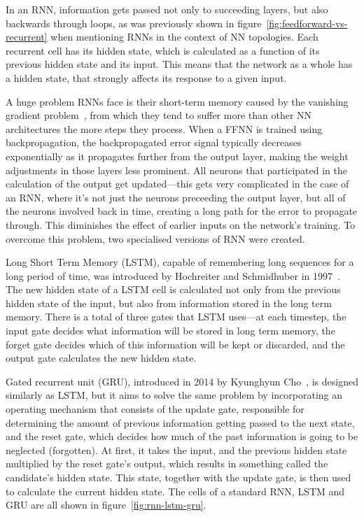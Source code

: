 In an RNN, information gets passed not only to succeeding layers, but also backwards through
loops, as was previously shown in figure~\ref{fig:feedforward-vs-recurrent} when mentioning RNNs
in the context of NN topologies. Each recurrent cell has its
 hidden state, which is calculated as a function of
its previous hidden state and its input. This means that the network as a whole
has a hidden state, that strongly affects its response to a given input.

A huge problem RNNs face is their short-term memory caused by the vanishing gradient
problem~\cite{hochreiter1991untersuchungen},
from which they tend to suffer more than other NN architectures the more steps they process.
When a FFNN is trained using backpropagation, the backpropagated error signal typically decreases
exponentially as it propagates further from the output layer, making the weight adjustments
in those layers less prominent. All neurons that participated in the calculation
of the output get updated---this gets very complicated in the case of an RNN,
where it's not just the neurons preceeding the output layer, but all of the neurons
involved back in time, creating a long path for the error to propagate through.
This diminishes the effect of earlier inputs on the network's training.
To overcome this problem, two specialised versions of RNN were created.

Long Short Term Memory (LSTM), capable of remembering long sequences for a long period of time,
was introduced by Hochreiter and Schmidhuber in 1997~\cite{hochreiter1997long}.
The new hidden state of a LSTM cell is calculated not only from the previous hidden
state of the input, but also from information stored in the long term memory.
There is a total of three gates that LSTM uses---at each timestep, the input gate decides what information
will be stored in long term memory, the forget gate decides which of this information
will be kept or discarded, and the output gate calculates the new hidden state.

Gated recurrent unit (GRU), introduced in 2014 by Kyunghyun Cho~\cite{cho-gru},
is designed similarly as LSTM, but it aims to solve the same problem by incorporating
an operating mechanism that consists of the update gate, responsible for determining the amount
of previous information getting passed to the next state, and the reset gate,
which decides how much of the past information is going to be neglected (forgotten).
At first, it takes the input, and the previous hidden state multiplied by
the reset gate's output, which results in something called the candidate's hidden state.
This state, together with the update gate, is then used to calculate the current hidden state.
The cells of a standard RNN, LSTM and GRU are all shown in figure~\ref{fig:rnn-lstm-gru}.


